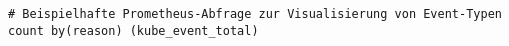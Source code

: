 \begin{verbatim}
# Beispielhafte Prometheus-Abfrage zur Visualisierung von Event-Typen
count by(reason) (kube_event_total)
\end{verbatim}
